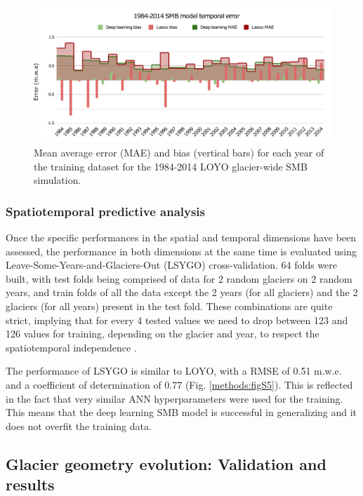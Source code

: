\begin{figure}[t]
\centering
\includegraphics[width=16cm]{Figures/methods/Figure_10.pdf}
\caption{Mean average error (MAE) and bias (vertical bars) for each year of the training dataset for the 1984-2014 LOYO glacier-wide SMB simulation.}
\label{methods:fig10}
\end{figure}

\subsubsection{Spatiotemporal predictive analysis}

Once the specific performances in the spatial and temporal dimensions have been assessed, the performance in both dimensions at the same time is evaluated using Leave-Some-Years-and-Glaciers-Out (LSYGO) cross-validation. 64 folds were built, with test folds being comprised of data for 2 random glaciers on 2 random years, and train folds of all the data except the 2 years (for all glaciers) and the 2 glaciers (for all years) present in the test fold. These combinations are quite strict, implying that for every 4 tested values we need to drop between 123 and 126 values for training, depending on the glacier and year, to respect the spatiotemporal independence \citep{roberts_cross-validation_2017}. 

The performance of LSYGO is similar to LOYO, with a RMSE of 0.51 m.w.e. and a coefficient of determination of 0.77 (Fig. \ref{methods:figS5}).  This is reflected in the fact that very similar ANN hyperparameters were used for the training. This means that the deep learning SMB model is successful in generalizing and it does not overfit the training data. 

\subsection{Glacier geometry evolution: Validation and results} 
\label{methods:case_study:deltah}

